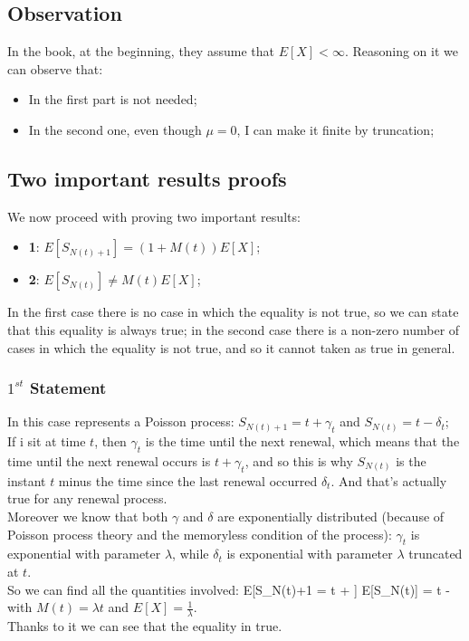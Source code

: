 	\subsection*{Observation}
	In the book, at the beginning, they assume that $E[X] < \infty$. Reasoning on it we can observe that:
	\begin{itemize}
	\item In the first part is not needed;
	\item In the second one, even though $\mu = 0$, I can make it finite by truncation;
	\end{itemize}
	\subsection{Two important results proofs}
	We now proceed with proving two important results:
	\begin{itemize}
	\item \textbf{1}: $E[S_{N(t)+1}] = (1+M(t))E[X]$;
	\item \textbf{2}: $E[S_{N(t)}] \ne M(t)E[X]$;
	\end{itemize}
	In the first case there is no case in which the equality is not true, so we can state that this equality is always true; in the second case there is a non-zero number of cases in which the equality is not true, and so it cannot taken as true in general.
	\subsubsection*{$1^{st}$ Statement}
	In this case represents a Poisson process: $S_{N(t)+1} = t + \gamma_t$ and $S_{N(t)} = t - \delta_t$;\\
	If i sit at time $t$, then $\gamma_t$ is the time until the next renewal, which means that the time until the next renewal occurs is $t + \gamma_t$, and so this is why $S_{N(t)}$ is the instant $t$ minus the time since the last renewal occurred $\delta_t$. And that's actually true for any renewal process.\\
	Moreover we know that both $\gamma$ and $\delta$ are exponentially distributed (because of Poisson process theory and the memoryless condition of the process): $\gamma_t$ is exponential with parameter $\lambda$, while $\delta_t$ is exponential with parameter $\lambda$ truncated at $t$.\\
	So we can find all the quantities involved:%
	\beq
	E[S_{N(t)+1} = t + ] \qquad E[S_{N(t)}] = t - 
	\eeq
	with $M(t) = \lambda t$ and $E[X] = \frac{1}{\lambda}$.\\
	Thanks to it we can see that the equality in true.
